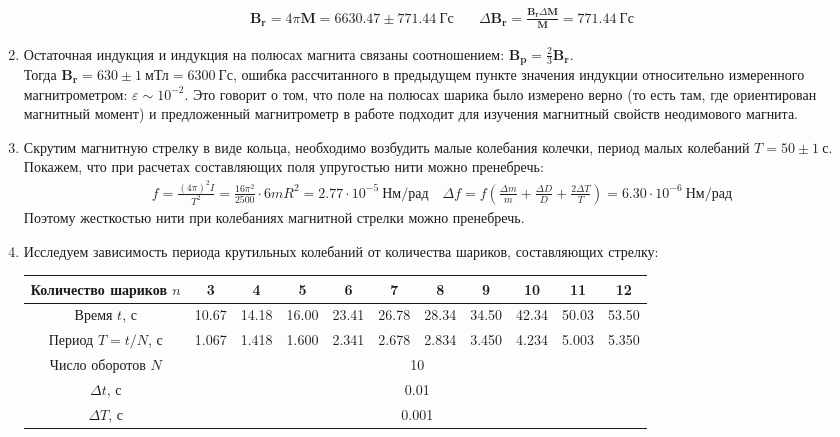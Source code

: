 \documentclass[a4paper, 10pt]{article}
\begin{document}
\begin{enumerate}
\begin{align*}
        \mathbf{B_{r}} = 4\pi\mathbf{M} = 6630.47\pm 771.44\ \text{Гс} & \quad \Delta \mathbf{B_{r}} = \frac{\mathbf{B_{r}}\Delta \mathbf{M}}{\mathbf{M}} = 771.44\ \text{Гс}
    \end{align*}
    \item Остаточная индукция и индукция на полюсах магнита связаны соотношением: $\mathbf{B_{p}} = \frac{2}{3}\mathbf{B_{r}}$.\\ 
    Тогда $\mathbf{B_{r}} = 630\pm 1\ \text{мТл} = 6300\ \text{Гс}$, ошибка рассчитанного в предыдущем пункте значения индукции относительно измеренного магнитрометром: $\varepsilon \sim 10^{-2}$. Это говорит о том, что
    поле на полюсах шарика было измерено верно (то есть там, где ориентирован магнитный момент) и предложенный магнитрометр в работе подходит для изучения магнитный свойств
    неодимового магнита.
    \item Скрутим магнитную стрелку в виде кольца, необходимо возбудить малые колебания колечки, период малых колебаний $T = 50\pm 1\ \text{с}$. Покажем, что при расчетах составляющих поля упругостью нити можно пренебречь:
    \begin{align*}
        f = \frac{(4\pi)^{2} I}{T^{2}} = \frac{16\pi^{2}}{2500}\cdot 6mR^{2} = 2.77\cdot 10^{-5}\ \text{Нм/рад} \quad \Delta f = f \left(\frac{\Delta m}{m} + \frac{\Delta D}{D} + \frac{2\Delta T}{T}\right) = 6.30\cdot 10^{-6}\ \text{Нм/рад}
    \end{align*}
    Поэтому жесткостью нити при колебаниях магнитной стрелки можно пренебречь.
    \item Исследуем зависимость периода крутильных колебаний от количества шариков, составляющих стрелку:
    \begin{center}
        \begin{tabular}{|c|c|c|c|c|c|c|c|c|c|c|}
            \hline
            Количество шариков $n$ & 3 & 4 & 5 & 6 & 7 & 8 & 9 & 10 & 11 & 12\\
            \hline
            Время $t$, с & 10.67 & 14.18 & 16.00 & 23.41 & 26.78 & 28.34 & 34.50 & 42.34 & 50.03 & 53.50\\
            Период $T = t/N$, с & 1.067 & 1.418 & 1.600 & 2.341 & 2.678 & 2.834 & 3.450 & 4.234 & 5.003 & 5.350\\
            \hline
            Число оборотов $N$ & \multicolumn{10}{|c|}{10}\\
            $\Delta t$, с & \multicolumn{10}{|c|}{0.01}\\
            $\Delta T$, с & \multicolumn{10}{|c|}{0.001}\\

\end{tabular}
\end{center}
\end{enumerate}
\end{document}
